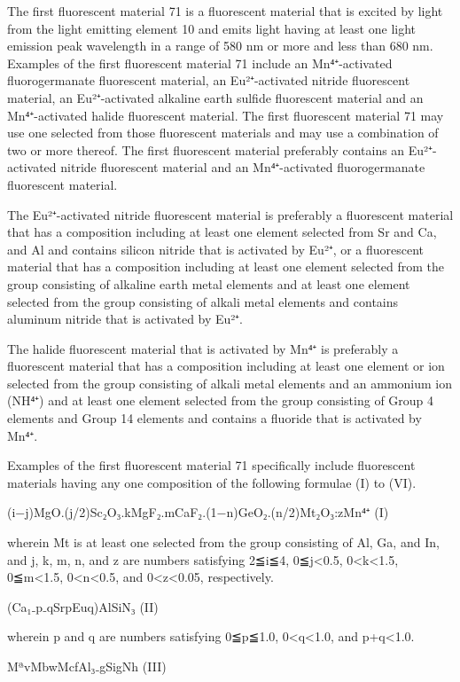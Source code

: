 \documentclass[11pt,a4paper]{article}
\begin{document}
The first fluorescent material 71 is a fluorescent material that is excited by light from the light emitting element 10 and emits light having at least one light emission peak wavelength in a range of 580 nm or more and less than 680 nm. Examples of the first fluorescent material 71 include an Mn⁴⁺-activated fluorogermanate fluorescent material, an Eu²⁺-activated nitride fluorescent material, an Eu²⁺-activated alkaline earth sulfide fluorescent material and an Mn⁴⁺-activated halide fluorescent material. The first fluorescent material 71 may use one selected from those fluorescent materials and may use a combination of two or more thereof. The first fluorescent material preferably contains an Eu²⁺-activated nitride fluorescent material and an Mn⁴⁺-activated fluorogermanate fluorescent material.

The Eu²⁺-activated nitride fluorescent material is preferably a fluorescent material that has a composition including at least one element selected from Sr and Ca, and Al and contains silicon nitride that is activated by Eu²⁺, or a fluorescent material that has a composition including at least one element selected from the group consisting of alkaline earth metal elements and at least one element selected from the group consisting of alkali metal elements and contains aluminum nitride that is activated by Eu²⁺.

The halide fluorescent material that is activated by Mn⁴⁺ is preferably a fluorescent material that has a composition including at least one element or ion selected from the group consisting of alkali metal elements and an ammonium ion (NH⁴⁺) and at least one element selected from the group consisting of Group 4 elements and Group 14 elements and contains a fluoride that is activated by Mn⁴⁺.

Examples of the first fluorescent material 71 specifically include fluorescent materials having any one composition of the following formulae (I) to (VI).

(i−j)MgO.(j/2)Sc₂O₃.kMgF₂.mCaF₂.(1−n)GeO₂.(n/2)Mt₂O₃:zMn⁴⁺ (I)

wherein Mt is at least one selected from the group consisting of Al, Ga, and In, and j, k, m, n, and z are numbers satisfying 2≦i≦4, 0≦j<0.5, 0<k<1.5, 0≦m<1.5, 0<n<0.5, and 0<z<0.05, respectively.

(Ca₁₋p₋qSrpEuq)AlSiN₃ (II)

wherein p and q are numbers satisfying 0≦p≦1.0, 0<q<1.0, and p+q<1.0.

MªvMbwMcfAl₃₋gSigNh (III)
\end{document}
